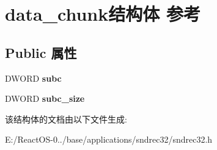 \hypertarget{structdata__chunk}{}\section{data\+\_\+chunk结构体 参考}
\label{structdata__chunk}
\subsection*{Public 属性}
\begin{DoxyCompactItemize}
\item 
\mbox{\label{structdata__chunk_a853cad42d18bc20f8af32bf7f6d514f0}} 
D\+W\+O\+RD {\bfseries subc}
\item 
\mbox{\label{structdata__chunk_a48183baf0be0f3778f8bb6f4c7e1509e}} 
D\+W\+O\+RD {\bfseries subc\+\_\+size}
\end{DoxyCompactItemize}


该结构体的文档由以下文件生成\+:\begin{DoxyCompactItemize}
\item 
E\+:/\+React\+O\+S-\/0../base/applications/sndrec32/sndrec32.\+h\end{DoxyCompactItemize}

